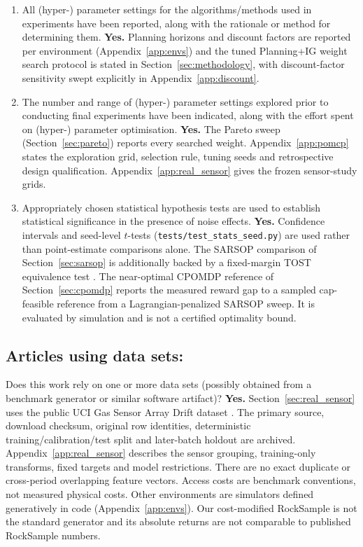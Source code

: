 \documentclass[manuscript, screen, review]{jair}
\begin{document}
\begin{enumerate}
\item All (hyper-) parameter settings for the algorithms/methods used in experiments have been reported, along with the rationale or method for determining them. \textbf{Yes.} Planning horizons and discount factors are reported per environment (Appendix~\ref{app:envs}) and the tuned Planning+IG weight search protocol is stated in Section~\ref{sec:methodology}, with discount-factor sensitivity swept explicitly in Appendix~\ref{app:discount}.
\item The number and range of (hyper-) parameter settings explored prior to conducting final experiments have been indicated, along with the effort spent on (hyper-) parameter optimisation. \textbf{Yes.} The Pareto sweep (Section~\ref{sec:pareto}) reports every searched weight. Appendix~\ref{app:pomcp} states the exploration grid, selection rule, tuning seeds and retrospective design qualification. Appendix~\ref{app:real_sensor} gives the frozen sensor-study grids.
\item Appropriately chosen statistical hypothesis tests are used to establish statistical significance in the presence of noise effects. \textbf{Yes.} Confidence intervals and seed-level $t$-tests (\texttt{tests/\allowbreak test\_\allowbreak stats\_\allowbreak seed.py}) are used rather than point-estimate comparisons alone. The SARSOP comparison of Section~\ref{sec:sarsop} is additionally backed by a fixed-margin TOST equivalence test \citep{schuirmann1987}. The near-optimal CPOMDP reference of Section~\ref{sec:cpomdp} reports the measured reward gap to a sampled cap-feasible reference from a Lagrangian-penalized SARSOP sweep. It is evaluated by simulation and is not a certified optimality bound.
\end{enumerate}

\subsection*{Articles using data sets:}
Does this work rely on one or more data sets (possibly obtained from a benchmark generator or similar software artifact)? \textbf{Yes.} Section~\ref{sec:real_sensor} uses the public UCI Gas Sensor Array Drift dataset \citep{vergara2012data,vergara2012}. The primary source, download checksum, original row identities, deterministic training/calibration/test split and later-batch holdout are archived. Appendix~\ref{app:real_sensor} describes the sensor grouping, training-only transforms, fixed targets and model restrictions. There are no exact duplicate or cross-period overlapping feature vectors. Access costs are benchmark conventions, not measured physical costs. Other environments are simulators defined generatively in code (Appendix~\ref{app:envs}). Our cost-modified RockSample is not the standard generator and its absolute returns are not comparable to published RockSample numbers.
\end{document}
